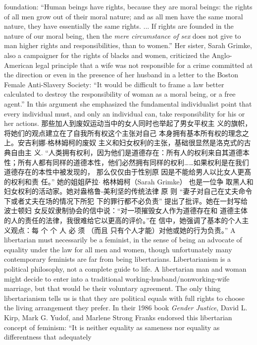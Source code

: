 \begin{paracol}{2}
foundation: ``Human beings have rights, because they are moral
beings: the rights of all men grow out of their moral nature;
and as all men have the same moral nature, they have essentially the same rights. ... If rights are founded in the nature of
our moral being, then the \textit{mere circumstance of sex} does not give to
man higher rights and responsibilities, than to women.'' Her
sister, Sarah Grimke, also a campaigner for the rights of blacks
and women, criticized the Anglo-American legal principle that
a wife was not responsible for a crime committed at the direction or even in the presence of her husband in a letter to the
Boston Female Anti-Slavery Society: ``It would be difficult to
frame a law better calculated to destroy the responsibility of
woman as a moral being, or a free agent.'' In this argument she
emphasized the fundamental individualist point that every individual must, and only an individual can, take responsibility
for his or her actions.
\switchcolumn
那些加人到废奴运动当中的女人同时也举起了男女平权主
义的旗帜，将她们的观点建立在了自我所有权这个主张对自己
本身拥有基本所有权的理念之上。安吉利娜$\cdot$格林姆柯的废奴
主义和妇女权利的主张，基础很显然是洛克式的古典自由主
义. “人类拥有权利，因为他们是道德存在：所有人的权利来自其道德本性；所有人都有同样的道德本性，他们必然拥有同样的权利……如果权利是在我们道德存在的本性中被发现的，
那么仅仅由于性别原 因是不能给男人以比女人更髙的权利和责
任。” 她的姐姐萨拉$\cdot$ 格林姆柯（Sarah  Grimke） 也是一位争
取黑人和妇女权利的活动家。她对盎格鲁-美利坚的传统法律
原 则 “妻子对自己在丈夫命令下或者丈夫在场的情况下所犯
下的罪行都不必负责” 提出了批评。她在一封写给波士顿妇
女反奴隶制协会的信中说：“对一项摧毁女人作为道德存在和
道德主体的人的责任的法律，我很难给它以更高的评价。”在
信中，她强调了基本的个人主义观点：每 个 个 人 必 须 （而且
只有个人才能）对他或她的行为负责。”
\switchcolumn*
A libertarian must necessarily be a feminist, in the sense of
being an advocate of equality under the law for all men and
women, though unfortunately many contemporary feminists
are far from being libertarians. Libertarianism is a political philosophy, not a complete guide to life. A libertarian man and
woman might decide to enter into a traditional working-husband/nonworking-wife marriage, but that would be their voluntary agreement. The only thing libertarianism tells us is that
they are political equals with full rights to choose the living
arrangement they prefer. In their 1986 book \textit{Gender Justice},
David L. Kirp, Mark G. Yudof, and Marlene Strong Franks endorsed this libertarian concept of feminism: ``It is neither equality as sameness nor equality as differentness that adequately

\end{paracol}
